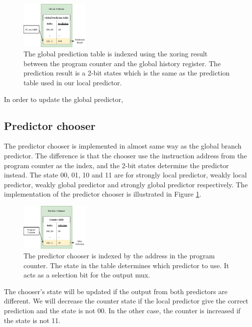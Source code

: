 \documentclass[conference]{IEEEtran}
\begin{document}
\begin{figure}[h]
    \centering
    \includegraphics[width=0.3\textwidth]{imgs/global_predictor}
    \caption{The global prediction table is indexed using the xoring result between the program counter and
    the global history register. The prediction result is a 2-bit states which is the same as the prediction
    table used in our local predictor.}
    \label{fig:global_predictor}
\end{figure}

In order to update the global predictor,

\subsection{Predictor chooser}

The predictor chooser is implemented in almost same way as the global branch predictor. The difference is that the chooser
use the instruction address from the program counter as the index, and the 2-bit states determine the
predictor instead. The state 00, 01, 10 and 11 are for strongly local predictor, weakly local predictor,
weakly global predictor and strongly global predictor respectively. The implementation of the predictor chooser
is illustrated in Figure \ref{fig:global_predictor}.

\begin{figure}[h]
    \centering
    \includegraphics[width=0.3\textwidth]{imgs/predictor_chooser}
    \caption{The predictor chooser is indexed by the address in the program counter. The state in the table
    determines which predictor to use. It acts as a selection bit for the output mux.}
    \label{fig:predictor_chooser}
\end{figure}

The chooser's state will be updated if the output from both predictors are different. We will decrease the
counter state if the local predictor give the correct prediction and the state is not 00. In the other case,
the counter is increased if the state is not 11.
\end{document}
